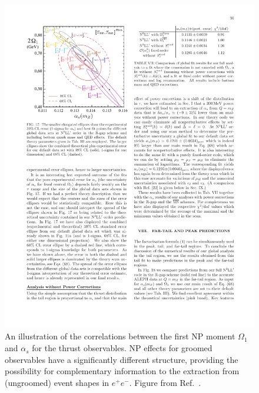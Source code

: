 \documentclass[11pt]{cernrep}
\begin{document}
\begin{figure}[t]
\begin{center}
\includegraphics[width = 0.6\columnwidth]{jetsub_alphas_correlation_firstmoment.pdf}
\end{center}
\caption{An illustration of the correlations between the first NP moment $\Omega_1$ and $\alpha_s$ for the thrust observables.
%
NP effects for groomed observables have a significantly different structure, providing the possibility for complementary information to the extraction from (ungroomed) event shapes in $e^+e^-$.
%
Figure from Ref.~\cite{Abbate:2010xh}.}
\label{jetsub_alphas_fig:correlation_firstmoment}
\end{figure}
\end{document}
